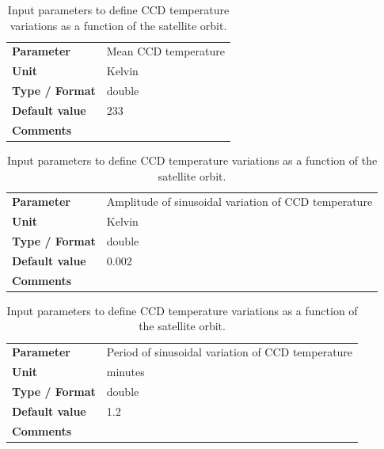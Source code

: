 \documentclass[11pt]{article}      %
\def\HCode#1{}
\def\htmlanchor#1{\HCode{<a id="#1"></a>}}
\begin{document}
\begin{table}[hb]
  \caption{Input parameters to define CCD temperature variations as a function of the satellite orbit.}

  \htmlanchor{ccdMeanTemperature}
  \begin{tabular}{| l | p{13cm} |}
    \hline 
    {\bf Parameter} & Mean CCD temperature\\
    {\bf Unit} & Kelvin\\
    {\bf Type / Format} & double\\
    {\bf Default value} & 233\\
    {\bf Comments} & \\
    \hline
  \end{tabular}
  \bigskip

  \htmlanchor{ccdTemperatureAmplitude}
  \begin{tabular}{| l | p{13cm} |}
    \hline 
    {\bf Parameter} & Amplitude of sinusoidal variation of CCD temperature\\
    {\bf Unit} & Kelvin\\
    {\bf Type / Format} & double\\
    {\bf Default value} & 0.002\\
    {\bf Comments} & \\
    \hline
  \end{tabular}
  \bigskip 

  \htmlanchor{ccdTemperaturePeriod}
  \begin{tabular}{| l | p{13cm} |}
    \hline 
    {\bf Parameter} & Period of sinusoidal variation of CCD temperature\\
    {\bf Unit} & minutes\\
    {\bf Type / Format} & double\\
    {\bf Default value} & 1.2\\
    {\bf Comments} & \\
    \hline
  \end{tabular}
  \bigskip

  \label{tab:orbit3}
\end{table}
\end{document}
